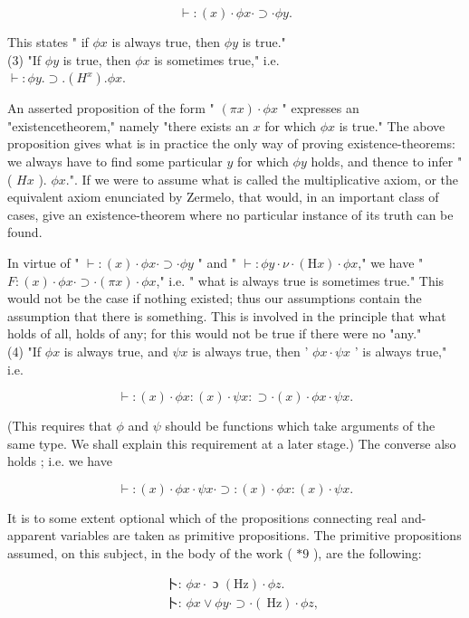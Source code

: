 \documentclass[10pt]{article}
\begin{document}
$$
\vdash:(x) \cdot \phi x \cdot \supset \cdot \phi y .
$$

This states " if $\phi x$ is always true, then $\phi y$ is true."\\
(3) "If $\phi y$ is true, then $\phi x$ is sometimes true," i.e.\\
$\vdash: \phi y . \supset .\left(H^{x}\right) . \phi x$.

An asserted proposition of the form " $(\pi x) \cdot \phi x$ " expresses an "existencetheorem," namely "there exists an $x$ for which $\phi x$ is true." The above proposition gives what is in practice the only way of proving existence-theorems: we always have to find some particular $y$ for which $\phi y$ holds, and thence to infer " ( $H x$ ). $\phi x$.". If we were to assume what is called the multiplicative axiom, or the equivalent axiom enunciated by Zermelo, that would, in an important class of cases, give an existence-theorem where no particular instance of its truth can be found.

In virtue of " $\vdash:(x) \cdot \phi x \cdot \supset \cdot \phi y$ " and " $\vdash: \phi y \cdot \nu \cdot(\mathrm{H} x) \cdot \phi x$," we have " $F:(x) \cdot \phi x \cdot \supset \cdot(\pi x) \cdot \phi x$," i.e. " what is always true is sometimes true." This would not be the case if nothing existed; thus our assumptions contain the assumption that there is something. This is involved in the principle that what holds of all, holds of any; for this would not be true if there were no "any."\\
(4) "If $\phi x$ is always true, and $\psi x$ is always true, then ' $\phi x \cdot \psi x$ ' is always true," i.e.

$$
\vdash:(x) \cdot \phi x:(x) \cdot \psi x: \supset \cdot(x) \cdot \phi x \cdot \psi x .
$$

(This requires that $\phi$ and $\psi$ should be functions which take arguments of the same type. We shall explain this requirement at a later stage.) The converse also holds ; i.e. we have

$$
\vdash:(x) \cdot \phi x \cdot \psi x \cdot \supset:(x) \cdot \phi x:(x) \cdot \psi x .
$$

It is to some extent optional which of the propositions connecting real and-apparent variables are taken as primitive propositions. The primitive propositions assumed, on this subject, in the body of the work ( $* 9$ ), are the following:


\begin{align*}
& \text { 卜: } \phi x \cdot \text { ɔ }(\mathrm{Hz}) \cdot \phi z .  \tag{1}\\
& \text { 卜: } \phi x \vee \phi y \cdot \supset \cdot(\mathrm{~Hz}) \cdot \phi z, \tag{2}
\end{align*}
\end{document}

